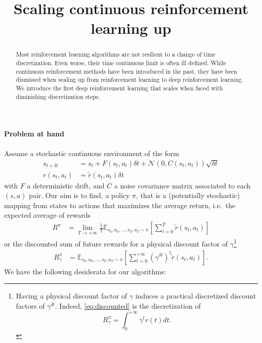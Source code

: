 \documentclass[11pt]{article}
\title{Scaling continuous reinforcement learning up}
\newcommand{\deltat}{{\delta t}}
\newcommand{\gauss}{\mathcal{N}}
\newcommand{\E}{\mathbb{E}}
\begin{document}
\maketitle
\begin{abstract}
	Most reinforcement learning algorithms are not resilient to a change of
	time discretization. Even worse, their time continuous limit is often
	ill defined.  While continuous reinforcement methods have been
	introduced in the past, they have been dismissed when scaling up from
	reinforcement learning to deep reinforcement learning. We introduce the
	first deep reinforcement learning that scales when faced with
	diminishing discretization steps.
\end{abstract}
\paragraph{Problem at hand}
Assume a stochastic continuous environment of the form
\begin{align}
	s_{t+\deltat} &= s_t + F(s_t, a_t) \deltat + \gauss(0, C(s_t, a_t)) \sqrt{\deltat}\\
	r(s_t, a_t) &= \tilde{r}(s_t, a_t) \deltat
\end{align}
with $F$ a deterministic drift, and $C$ a noise covariance matrix
associated to each $(s, a)$ pair. Our aim is to find, a policy $\pi$, that is a
(potentially stochastic) mapping from states to actions that maximizes the
average return, i.e.\ the expected average of rewards
\begin{align}
	R^\pi &= \lim\limits_{T\to+\infty}
	\frac{1}{T}
	\E_{s_0, a_0, \ldots, s_T, a_T\sim\pi}\left[
		\sum\limits_{t = 0}^T \tilde{r}(s_t, a_t)
	\right]
\end{align}
or the discounted sum of future rewards for a physical discount factor of $\gamma$\footnote{
	Having a physical discount factor of $\gamma$ induces a practical discretized discount
	factors of $\gamma^\deltat$. Indeed, \eqref{eq:discounted} is the discretization of
	\begin{equation}
		R^\pi_\gamma = \int_{0}^{+\infty} \gamma^{t} r(t) dt.
		\label{eq:discounted}
	\end{equation}
}
\begin{align}
	R^\pi_\gamma &= \E_{s_0, a_0, \ldots, s_T, a_T \sim \pi}
	\left[
		\sum\limits_{t=0}^{+\infty}
		(\gamma^\deltat)^t \tilde{r}(s_t, a_t) 
	\right].
\end{align}
We have the following desiderata for our algorithms:
\end{document}
